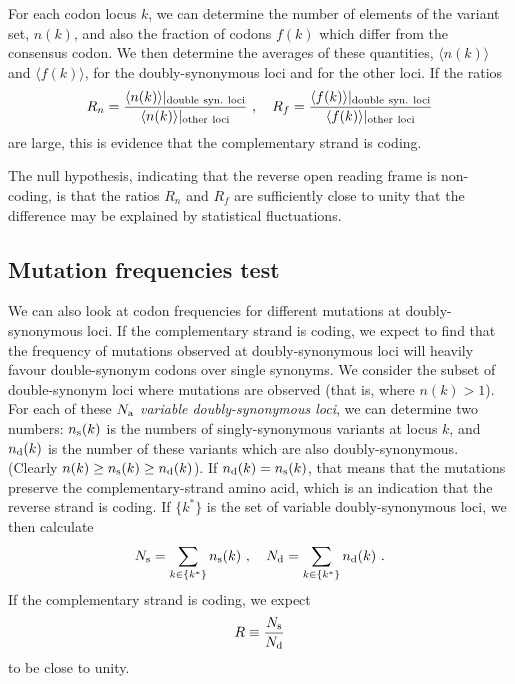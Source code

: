 \documentclass[unnumsec,webpdf,contemporary,large,namedate]{oup-authoring-template}%
\theoremstyle{thmstyleone}%
\theoremstyle{thmstyletwo}%
\theoremstyle{thmstylethree}%
\begin{document}
For each codon locus $k$, we can determine the number of elements of the variant set, $n(k)$,
and also the fraction of codons $f(k)$ which differ from the consensus codon.
We then determine the averages of these quantities, $\langle n(k)\rangle$ and $\langle f(k)\rangle$,
for the doubly-synonymous loci and for the other loci. If the ratios
%
\begin{equation}
\label{eq: 4.1}
R_n=\frac{\langle n(k)\rangle\vert_{\rm double\ syn.\ loci}}{\langle n(k)\rangle\vert_{\rm other\ loci}}
\ ,\ \ \
R_f=\frac{\langle f(k)\rangle\vert_{\rm double\ syn.\ loci}}{\langle f(k)\rangle\vert_{\rm other\ loci}}
\end{equation}
%
are large, this is evidence that the complementary strand is coding.

The null hypothesis, indicating that the reverse open reading frame is
non-coding, is that the ratios $R_n$ and $R_f$ are sufficiently close to
unity that the difference may be explained by statistical fluctuations.

\subsection{Mutation frequencies test}
\label{sec: 4.2}

We can also look at codon frequencies for different mutations at doubly-synonymous loci.
If the complementary strand is coding, we expect to find that the frequency of mutations
observed at doubly-synonymous loci will heavily favour double-synonym codons over
single synonyms.  We consider the subset of double-synonym loci where mutations
are observed (that is, where $n(k)>1$). For each of these $N_{\rm a}$ \emph{variable doubly-synonymous loci}, we can determine two numbers: $n_{\rm s}(k)$ is
the numbers of singly-synonymous variants at locus $k$, and $n_{\rm d}(k)$ is the number
of these variants which are also doubly-synonymous. (Clearly $n(k)\ge n_{\rm s}(k)\ge n_{\rm d}(k)$).
If $n_{\rm d}(k)=n_{\rm s}(k)$, that means that the mutations preserve the complementary-strand
amino acid, which is an indication that the reverse strand is coding. If $\{k^\ast\}$
is the set of variable doubly-synonymous loci, we then
calculate
%
\begin{equation}
\label{eq: 4.2}
N_{\rm s}=\sum_{k\in\{k^\ast\}} n_{\rm s}(k)
\ ,\ \ \
N_{\rm d}=\sum_{k\in\{k^\ast\}} n_{\rm d}(k)
\ .
\end{equation}
%
If the complementary strand is coding, we expect
%
\begin{equation}
\label{eq: 4.3}
R\equiv \frac{N_{\rm s}}{N_{\rm d}}
\end{equation}
%
to be close to unity.
\end{document}
